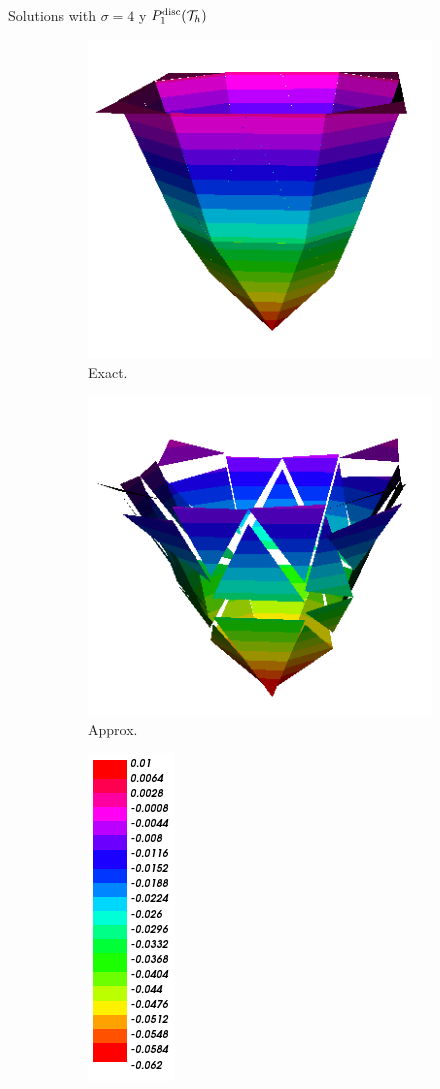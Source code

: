 	\begin{frame}{Solutions with $\sigma=4$ y $\relax{P}^{\text{disc}}_1(\mathcal{T}_h)$}
		\begin{figure}[h!]
			\begin{subfigure}[b]{0.2\textwidth}
				\centering
				\includegraphics[scale=0.16]{img/Difusion/Recortes/steady_diffusion_exact_n_4.png}
				\caption{\scriptsize Exact.}
			\end{subfigure}
			\begin{subfigure}[b]{0.2\textwidth}
				\centering
				\includegraphics[scale=0.16]{img/Difusion/Recortes/steady_diffusion_approx_n_4.png}
				\caption{\scriptsize Approx.}
			\end{subfigure}
			\begin{subfigure}[b]{0.1\textwidth}
				\centering
				\includegraphics[scale=0.23]{img/Difusion/Recortes/steady_diffusion_values.png}

\end{subfigure}
\end{figure}
\end{frame}
